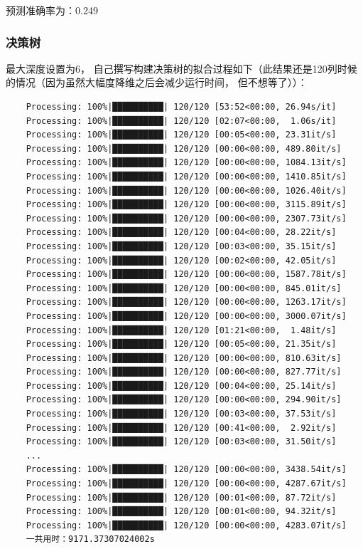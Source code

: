 \documentclass[UTF8,a4paper,AutoFakeBold,AutoFakeSlant]{article}
\begin{document}
预测准确率为：0.249


\subsubsection{决策树}

最大深度设置为6，
自己撰写构建决策树的拟合过程如下（此结果还是120列时候的情况（因为虽然大幅度降维之后会减少运行时间，
但不想等了））：

\begin{mdframed}[hidealllines=true,backgroundcolor=shadecolor]
  \begin{verbatim}
    Processing: 100%|██████████| 120/120 [53:52<00:00, 26.94s/it] 
    Processing: 100%|██████████| 120/120 [02:07<00:00,  1.06s/it]
    Processing: 100%|██████████| 120/120 [00:05<00:00, 23.31it/s]
    Processing: 100%|██████████| 120/120 [00:00<00:00, 489.80it/s]
    Processing: 100%|██████████| 120/120 [00:00<00:00, 1084.13it/s]
    Processing: 100%|██████████| 120/120 [00:00<00:00, 1410.85it/s]
    Processing: 100%|██████████| 120/120 [00:00<00:00, 1026.40it/s]
    Processing: 100%|██████████| 120/120 [00:00<00:00, 3115.89it/s]
    Processing: 100%|██████████| 120/120 [00:00<00:00, 2307.73it/s]
    Processing: 100%|██████████| 120/120 [00:04<00:00, 28.22it/s]
    Processing: 100%|██████████| 120/120 [00:03<00:00, 35.15it/s]
    Processing: 100%|██████████| 120/120 [00:02<00:00, 42.05it/s]
    Processing: 100%|██████████| 120/120 [00:00<00:00, 1587.78it/s]
    Processing: 100%|██████████| 120/120 [00:00<00:00, 845.01it/s]
    Processing: 100%|██████████| 120/120 [00:00<00:00, 1263.17it/s]
    Processing: 100%|██████████| 120/120 [00:00<00:00, 3000.07it/s]
    Processing: 100%|██████████| 120/120 [01:21<00:00,  1.48it/s]
    Processing: 100%|██████████| 120/120 [00:05<00:00, 21.35it/s]
    Processing: 100%|██████████| 120/120 [00:00<00:00, 810.63it/s]
    Processing: 100%|██████████| 120/120 [00:00<00:00, 827.77it/s]
    Processing: 100%|██████████| 120/120 [00:04<00:00, 25.14it/s]
    Processing: 100%|██████████| 120/120 [00:00<00:00, 294.90it/s]
    Processing: 100%|██████████| 120/120 [00:03<00:00, 37.53it/s]
    Processing: 100%|██████████| 120/120 [00:41<00:00,  2.92it/s]
    Processing: 100%|██████████| 120/120 [00:03<00:00, 31.50it/s]
    ...
    Processing: 100%|██████████| 120/120 [00:00<00:00, 3438.54it/s]
    Processing: 100%|██████████| 120/120 [00:00<00:00, 4287.67it/s]
    Processing: 100%|██████████| 120/120 [00:01<00:00, 87.72it/s]
    Processing: 100%|██████████| 120/120 [00:01<00:00, 94.32it/s] 
    Processing: 100%|██████████| 120/120 [00:00<00:00, 4283.07it/s]
    一共用时：9171.37307024002s
  \end{verbatim}
\end{mdframed}
\end{document}
